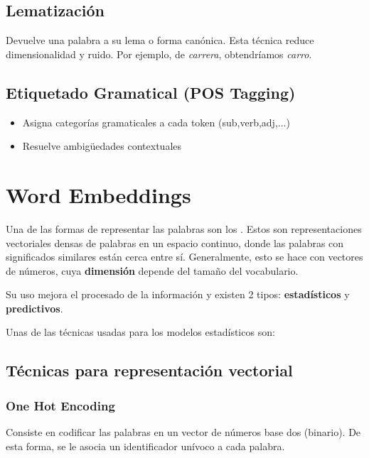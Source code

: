 \documentclass{report}
\begin{document}
\subsection{Lematización}
Devuelve una palabra a su lema o forma canónica. 
Esta técnica reduce dimensionalidad y ruido.
Por ejemplo, de \textit{carrera}, obtendríamos \textit{carro}.

\subsection{Etiquetado Gramatical (POS Tagging)}
\begin{itemize}
    \item Asigna categorías gramaticales a cada token (sub,verb,adj,...)
    \item Resuelve ambigüedades contextuales
\end{itemize}

\section{Word Embeddings}
Una de las formas de representar las palabras son los .  Estos son representaciones vectoriales densas de palabras en un espacio continuo, donde las palabras con significados similares están cerca entre sí.
Generalmente, esto se hace con vectores de números, cuya \textbf{dimensión} depende del tamaño del vocabulario.

Su uso mejora el procesado de la información y existen 2 tipos: \textbf{estadísticos} y \textbf{predictivos}.

Unas de las técnicas usadas para los modelos estadísticos son:

\subsection{Técnicas para representación vectorial}
\localtableofcontents

\subsubsection{One Hot Encoding}
Consiste en codificar las palabras en un vector de números base dos (binario).
De esta forma, se le asocia un identificador unívoco a cada palabra.
\end{document}
